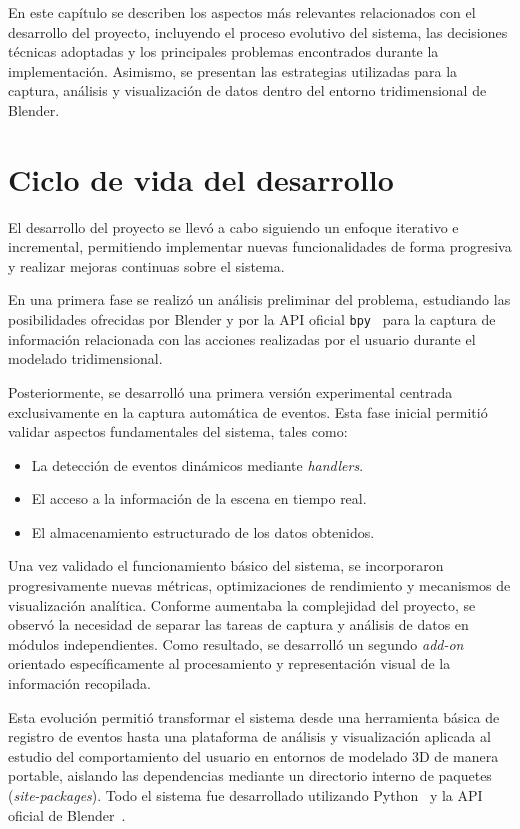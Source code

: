 
En este capítulo se describen los aspectos más relevantes relacionados con el desarrollo del proyecto, incluyendo el proceso evolutivo del sistema, las decisiones técnicas adoptadas y los principales problemas encontrados durante la implementación. Asimismo, se presentan las estrategias utilizadas para la captura, análisis y visualización de datos dentro del entorno tridimensional de Blender.

\section{Ciclo de vida del desarrollo}

El desarrollo del proyecto se llevó a cabo siguiendo un enfoque iterativo e incremental, permitiendo implementar nuevas funcionalidades de forma progresiva y realizar mejoras continuas sobre el sistema.

En una primera fase se realizó un análisis preliminar del problema, estudiando las posibilidades ofrecidas por Blender y por la API oficial \texttt{bpy}~\cite{blenderapi} para la captura de información relacionada con las acciones realizadas por el usuario durante el modelado tridimensional.

Posteriormente, se desarrolló una primera versión experimental centrada exclusivamente en la captura automática de eventos. Esta fase inicial permitió validar aspectos fundamentales del sistema, tales como:
\begin{itemize}
    \item La detección de eventos dinámicos mediante \textit{handlers}.
    \item El acceso a la información de la escena en tiempo real.
    \item El almacenamiento estructurado de los datos obtenidos.
\end{itemize}

Una vez validado el funcionamiento básico del sistema, se incorporaron progresivamente nuevas métricas, optimizaciones de rendimiento y mecanismos de visualización analítica. Conforme aumentaba la complejidad del proyecto, se observó la necesidad de separar las tareas de captura y análisis de datos en módulos independientes. Como resultado, se desarrolló un segundo \textit{add-on} orientado específicamente al procesamiento y representación visual de la información recopilada.

Esta evolución permitió transformar el sistema desde una herramienta básica de registro de eventos hasta una plataforma de análisis y visualización aplicada al estudio del comportamiento del usuario en entornos de modelado 3D de manera portable, aislando las dependencias mediante un directorio interno de paquetes (\textit{site-packages}). Todo el sistema fue desarrollado utilizando Python~\cite{pythonlang} y la API oficial de Blender~\cite{blenderapi}.

